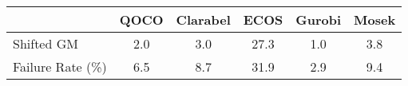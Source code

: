 \begin{tabular}{lccccc}
  \hline
   & \textbf{QOCO} & \textbf{Clarabel} & \textbf{ECOS} & \textbf{Gurobi} & \textbf{Mosek} \\ \hline
  Shifted GM & 2.0 & 3.0 & 27.3 & 1.0 & 3.8 \\ 
  Failure Rate (\%) & 6.5 & 8.7 & 31.9 & 2.9 & 9.4 \\ \hline 
\end{tabular}
